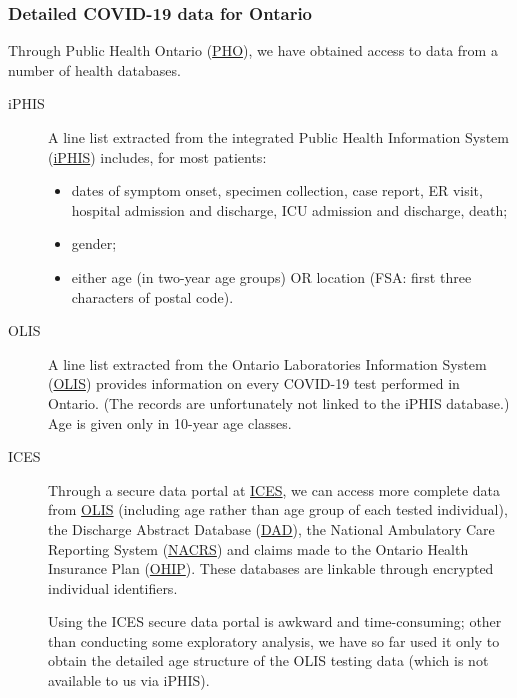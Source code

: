 \documentclass[12pt]{article}\usepackage[]{graphicx}\usepackage[]{color}
\begin{document}
\subsubsection*{Detailed COVID-19 data for Ontario}

Through Public Health Ontario
(\href{https://www.publichealthontario.ca/}{PHO}), we have obtained access to
data from a number of health databases.
\begin{description}
\item[iPHIS]A line list extracted from the integrated Public Health
  Information System
  (\href{https://www.publichealthontario.ca/en/diseases-and-conditions/infectious-diseases/ccm/iphis}{iPHIS})
  includes, for most patients:
  \begin{itemize}
  \item dates of symptom onset, specimen collection, case report, ER
    visit, hospital admission and discharge, ICU admission and
    discharge, death;
  \item gender;
  \item either age (in two-year age groups) OR location (FSA: first
    three characters of postal code).

  \end{itemize}
\item[OLIS]A line list extracted from the Ontario Laboratories
  Information System
  (\href{https://www.ehealthontario.on.ca/en/for-healthcare-professionals/ontario-laboratories-information-system-olis}{OLIS})
  provides information on every COVID-19 test performed in Ontario.
  (The records are unfortunately not linked to the iPHIS database.)
  Age is given only in 10-year age classes.
\item[ICES]Through a secure data portal at
  \href{https://www.ices.on.ca/}{ICES}, we can access more complete
  data from
  \href{https://www.ehealthontario.on.ca/en/for-healthcare-professionals/ontario-laboratories-information-system-olis}{OLIS}
  (including age rather than age group of each tested individual), the
  Discharge Abstract Database
  (\href{https://www.cihi.ca/en/discharge-abstract-database-metadata}{DAD}),
  the National Ambulatory Care Reporting System
  (\href{https://www.cihi.ca/en/national-ambulatory-care-reporting-system-metadata}{NACRS})
  and claims made to the Ontario Health Insurance Plan
  (\href{https://www.ontario.ca/page/what-ohip-covers}{OHIP}).  These
  databases are linkable through encrypted individual identifiers.

  Using the ICES secure data portal is awkward and time-consuming;
  other than conducting some exploratory analysis, we have so far used
  it only to obtain the detailed age structure of the OLIS testing
  data (which is not available to us via iPHIS).
\end{description}
\end{document}
